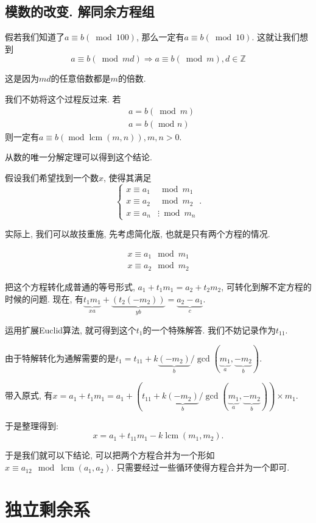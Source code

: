 \documentclass{ctexart}
\begin{document}
\subsection{模数的改变. 解同余方程组} 假若我们知道了$a \equiv b(\bmod 100)$, 那么一定有$a\equiv b(\bmod 10)$. 这就让我们想到
$$
a\equiv b(\bmod m d) \Rightarrow a\equiv b(\bmod m), d \in \mathbb{Z}
$$

这是因为$md$的任意倍数都是$m$的倍数. 

我们不妨将这个过程反过来. 若
$$
\begin{aligned}
& a=b(\bmod m) \\
& a=b(\text { mod } n)
\end{aligned}
$$
则一定有$a \equiv b(\operatorname{mod} \operatorname{lcm}(m, n)), m, n>0$.

从数的唯一分解定理可以得到这个结论. 

假设我们希望找到一个数$x$, 使得其满足
$$\begin{cases}x \equiv a_1 & \bmod m_1 \\ x \equiv a_2 & \bmod m_2 \\ x \equiv a_n & \vdots \bmod m_n\end{cases}.$$

实际上, 我们可以故技重施, 先考虑简化版, 也就是只有两个方程的情况.

$$
\begin{aligned}
x \equiv a_1 \mod m_1 \\
x\equiv a_2 \mod m_2
\end{aligned}
$$

把这个方程转化成普通的等号形式, $a_1+t_1m_1=a_2+t_2m_2$, 可转化到解不定方程的时候的问题. 现在, 有$\underbrace{t_1m_1}_{xa}+\underbrace{(t_2(-m_2))}_{yb}=\underbrace{a_2-a_1}_c$. 

运用扩展Euclid算法, 就可得到这个$t_1$的一个特殊解答. 我们不妨记录作为$t_{11}$.

由于特解转化为通解需要的是$t_1=t_{11} +k \underbrace{(-m_2)}_b/\gcd(\underbrace{m_1}_a,\underbrace{-m_2}_b)$. 

带入原式, 有$x=a_1+t_1m_1=a_1+(t_{11}+k \underbrace{(-m_2)}_b/\gcd(\underbrace{m_1}_a,\underbrace{-m_2}_b))\times m_1$.

于是整理得到: 
$$
x=a_1+t_{11}m_1-k\operatorname{lcm}(m_1, m_2).
$$

于是我们就可以下结论, 可以把两个方程合并为一个形如$x\equiv a_{12} \mod \operatorname{lcm}(a_1, a_2)$. 只需要经过一些循环使得方程合并为一个即可. 

\section{独立剩余系} 
\end{document}
